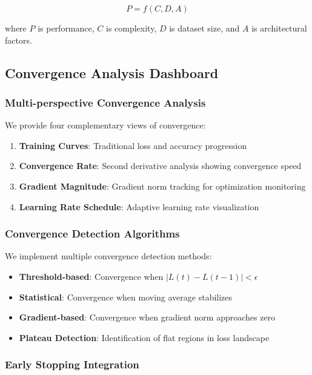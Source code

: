 \documentclass[12pt,a4paper]{article}
\begin{document}
\begin{equation}
    P = f(C, D, A)
\end{equation}

where \( P \) is performance, \( C \) is complexity, \( D \) is dataset size, and \( A \) is architectural factors.

\subsection{Convergence Analysis Dashboard}
\label{subsec:convergence}

\subsubsection{Multi-perspective Convergence Analysis}

We provide four complementary views of convergence:

\begin{enumerate}
    \item \textbf{Training Curves}: Traditional loss and accuracy progression
    \item \textbf{Convergence Rate}: Second derivative analysis showing convergence speed
    \item \textbf{Gradient Magnitude}: Gradient norm tracking for optimization monitoring
    \item \textbf{Learning Rate Schedule}: Adaptive learning rate visualization
\end{enumerate}

\subsubsection{Convergence Detection Algorithms}

We implement multiple convergence detection methods:

\begin{itemize}
    \item \textbf{Threshold-based}: Convergence when \( |L(t) - L(t-1)| < \epsilon \)
    \item \textbf{Statistical}: Convergence when moving average stabilizes
    \item \textbf{Gradient-based}: Convergence when gradient norm approaches zero
    \item \textbf{Plateau Detection}: Identification of flat regions in loss landscape
\end{itemize}

\subsubsection{Early Stopping Integration}
\end{document}
